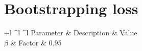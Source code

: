 \section{Bootstrapping loss}
\label{sec:bootstrapping_loss}

\begin{table}[htp]
\caption{Hyperparameters for bootstrapping}
\begin{center}
\begin{adjustbox}{max width=\textwidth}
\begin{tabular}{+l ^l ^l}\hline
\rowstyle{\bfseries}
 		 Parameter & Description & Value\\\hline
 		 $\beta$ & Factor & 0.95 \\\hline
\end{tabular}
\end{adjustbox}
\end{center}
\label{tab:curriculum_parameters}
\end{table}